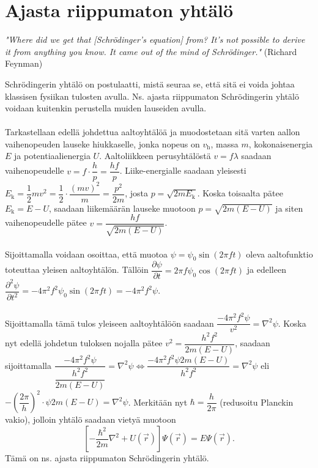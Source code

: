 \documentclass{article}
\begin{document}
\newpage
\section{Ajasta riippumaton yhtälö}
\begin{center}
    \textit{"Where did we get that [Schrödinger's equation] from? It's not possible to derive it from anything you know. It came out of the mind of Schrödinger."} (Richard Feynman)
\end{center}
Schrödingerin yhtälö on postulaatti, mistä seuraa se, että sitä ei voida johtaa klassisen fysiikan tulosten avulla. Ns. ajasta riippumaton Schrödingerin yhtälö voidaan kuitenkin perustella muiden lauseiden avulla.\\
 \\
Tarkastellaan edellä johdettua aaltoyhtälöä ja muodostetaan sitä varten aallon vaihenopeuden lauseke hiukkaselle, jonka nopeus on \(v_\text{h}\), massa \(m\), kokonaisenergia \(E\) ja potentiaalienergia \(U\). Aaltoliikkeen perusyhtälöstä \(v=f\lambda\) saadaan vaihenopeudelle \(v=f\cdot \dfrac{h}{p}=\dfrac{hf}{p}\). Liike-energialle saadaan yleisesti \(E_\text{k}=\dfrac{1}{2}mv^2=\dfrac{1}{2}\cdot \dfrac{(mv)^2}{m}=\dfrac{p^2}{2m}\), josta \(p=\sqrt{2mE_\text{k}}\). Koska toisaalta pätee \(E_\text{k}=E-U\), saadaan liikemäärän lauseke muotoon \(p=\sqrt{2m(E-U)}\) ja siten vaihenopeudelle pätee \(v=\dfrac{hf}{\sqrt{2m(E-U)}}\).\\
 \\
Sijoittamalla voidaan osoittaa, että muotoa \(\psi =\psi_0 \sin (2\pi ft)\) oleva aaltofunktio toteuttaa yleisen aaltoyhtälön. Tällöin \(\dfrac{\partial \psi}{\partial t}=2\pi f\psi _0 \cos (2\pi ft)\) ja edelleen \(\dfrac{\partial ^2 \psi}{\partial t^2}=-4\pi ^2 f^2 \psi _0 \sin (2\pi ft)=-4\pi ^2 f^2 \psi\).\\
 \\
Sijoittamalla tämä tulos yleiseen aaltoyhtälöön saadaan \(\dfrac{-4\pi ^2 f^2 \psi}{v^2}=\nabla ^2 \psi\). Koska nyt edellä johdetun tuloksen nojalla pätee \(v^2=\dfrac{h^2 f^2}{2m(E-U)}\), saadaan sijoittamalla \(\dfrac{-4\pi ^2 f^2 \psi}{\dfrac{h^2 f^2}{2m(E-U)}}=\nabla ^2 \psi \iff \dfrac{-4\pi^2 f^2 \psi 2m(E-U)}{h^2 f^2}=\nabla ^2 \psi\) eli \(-\left (\dfrac{2\pi}{h}\right )^2\cdot \psi 2m(E-U)=\nabla ^2 \psi\). Merkitään nyt \(\hbar =\dfrac{h}{2\pi}\) (redusoitu Planckin vakio), jolloin yhtälö saadaan vietyä muotoon $$\left [-\dfrac{\hbar ^2}{2m}\nabla ^2+U(\vec{r}) \right ] \Psi (\vec{r})=E \Psi (\vec{r}).$$ Tämä on ns. ajasta riippumaton Schrödingerin yhtälö.
\end{document}
